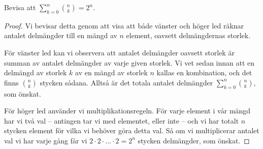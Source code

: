 \documentclass[nobib]{tufte-handout}
\begin{document}
\begin{example}\label{example_counting_all_subsets}
  Bevisa att $\sum_{k=0}^n \binom{n}{k} = 2^n$.

  \begin{proof}
    Vi bevisar detta genom att visa att både vänster och höger led räknar antalet delmängder till en mängd av $n$ element, oavsett delmängdernas storlek.

    För vänster led kan vi observera att antalet delmängder oavsett storlek är summan av antalet delmängder av varje given storlek. Vi vet sedan innan att en delmängd av storlek $k$ av en mängd av storlek $n$ kallas en kombination, och det finns $\binom{n}{k}$ stycken sådana. Alltså är det totala antalet delmängder $\sum_{k=0}^n \binom{n}{k}$, som önskat.

    För höger led använder vi multiplikationsregeln. För varje element i vår mängd har vi två val -- antingen tar vi med elementet, eller inte -- och vi har totalt $n$ stycken element för vilka vi behöver göra detta val. Så om vi multiplicerar antalet val vi har varje gång får vi $2\cdot2\cdot\ldots\cdot2 = 2^n$ stycken delmängder, som önskat.
  \end{proof}
\end{example}
\end{document}
